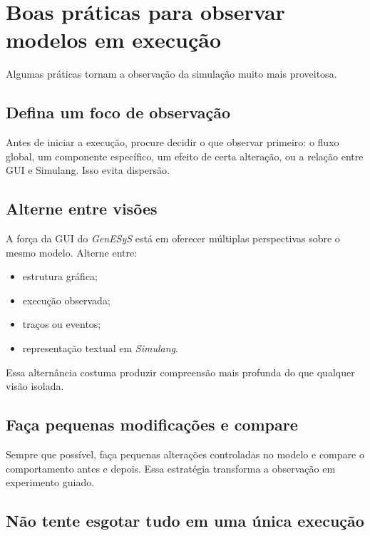 \section{Boas práticas para observar modelos em execução}
\label{sec:cap5_boas_praticas_observacao_execucao}

Algumas práticas tornam a observação da simulação muito mais proveitosa.

\subsection{Defina um foco de observação}
\label{subsec:cap5_defina_foco_observacao}

Antes de iniciar a execução, procure decidir o que observar primeiro: o fluxo global, um componente específico, um efeito de certa alteração, ou a relação entre GUI e Simulang. Isso evita dispersão.

\subsection{Alterne entre visões}
\label{subsec:cap5_alterne_entre_visoes}

A força da GUI do \textit{GenESyS} está em oferecer múltiplas perspectivas sobre o mesmo modelo. Alterne entre:
\begin{itemize}
    \item estrutura gráfica;
    \item execução observada;
    \item traços ou eventos;
    \item representação textual em \textit{Simulang}.
\end{itemize}

Essa alternância costuma produzir compreensão mais profunda do que qualquer visão isolada.

\subsection{Faça pequenas modificações e compare}
\label{subsec:cap5_pequenas_modificacoes_compare}

Sempre que possível, faça pequenas alterações controladas no modelo e compare o comportamento antes e depois. Essa estratégia transforma a observação em experimento guiado.

\subsection{Não tente esgotar tudo em uma única execução}
\label{subsec:cap5_nao_esgotar_tudo}

